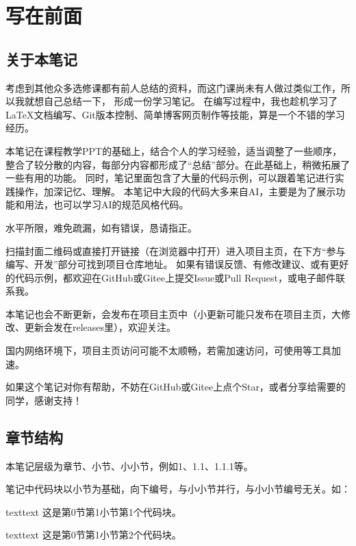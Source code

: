 \section{写在前面}
\subsection{关于本笔记}
考虑到其他众多选修课都有前人总结的资料，而这门课尚未有人做过类似工作，所以我就想自己总结一下，
形成一份学习笔记。
在编写过程中，我也趁机学习了\LaTeX{}文档编写、Git版本控制、简单博客网页制作等技能，算是一个不错的学习经历。

本笔记在课程教学PPT的基础上，结合个人的学习经验，适当调整了一些顺序，
整合了较分散的内容，每部分内容都形成了“总结”部分。在此基础上，稍微拓展了一些有用的功能。
同时，笔记里面包含了大量的代码示例，可以跟着笔记进行实践操作，加深记忆、理解。
本笔记中大段的代码大多来自AI，主要是为了展示功能和用法，也可以学习AI的规范风格代码。

水平所限，难免疏漏，如有错误，恳请指正。

扫描封面二维码或直接打开链接（在浏览器中打开）进入项目主页，在下方“参与编写、开发”部分可找到项目仓库地址。
如果有错误反馈、有修改建议、或有更好的代码示例，都欢迎在GitHub或Gitee上提交Issue或Pull Request，或电子邮件联系我。

本笔记也会不断更新，会发布在项目主页中（小更新可能只发布在项目主页，大修改、更新会发在releases里），欢迎关注。



国内网络环境下，项目主页访问可能不太顺畅，若需加速访问，可使用等工具加速。

如果这个笔记对你有帮助，不妨在GitHub或Gitee上点个Star，或者分享给需要的同学，感谢支持！
\subsection{章节结构}
本笔记层级为章节、小节、小小节，例如1、1.1、1.1.1等。

笔记中代码块以小节为基础，向下编号，与小小节并行，与小小节编号无关。如：
\begin{envcode}{text}{text}
这是第0节第1小节第1个代码块。
\end{envcode}
\begin{envcode}{text}{text}
这是第0节第1小节第2个代码块。
\end{envcode}

